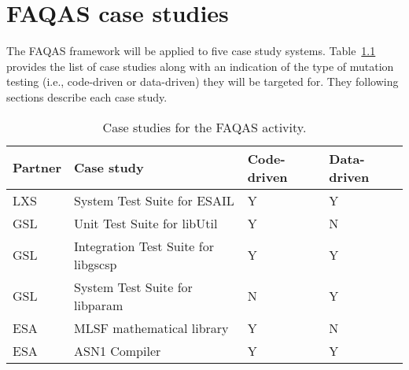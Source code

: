 
\chapter{FAQAS case studies}
\label{chapter:caseStudies}

The FAQAS framework will be applied to five case study systems. Table~\ref{tab:caseStudies} provides the list of case studies along with an indication of the type of mutation testing (i.e., code-driven or data-driven) they will be targeted for. They following sections describe each case study.

\begin{table}[htp]
\caption{Case studies for the FAQAS activity.}
\label{tab:caseStudies}
\begin{center}
\begin{tabular}{|p{1.2cm}|p{6cm}|p{2.5cm}|p{2.5cm}|}
\hline
\textbf{Partner}&\textbf{Case study}&\textbf{Code-driven}&\textbf{Data-driven}\\
\hline
LXS&System Test Suite for ESAIL&Y&Y\\
GSL&Unit Test Suite for libUtil&Y&N\\
GSL&Integration Test Suite for libgscsp&Y&Y\\
GSL&System Test Suite for libparam&N&Y\\
ESA&MLSF mathematical library&Y&N\\
ESA&ASN1 Compiler&Y&Y\\
\hline
\end{tabular}
\end{center}
\end{table}%

\clearpage










